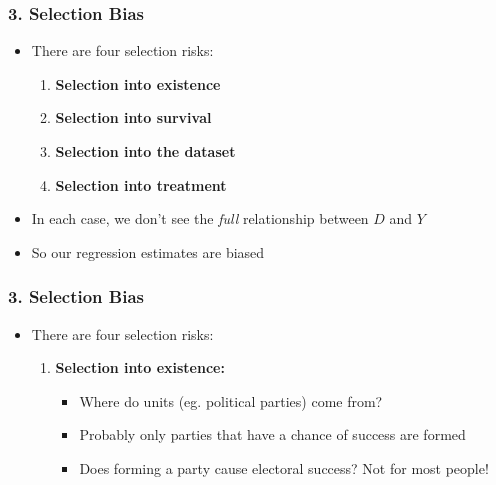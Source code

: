 \documentclass[xcolor=x11names,compress]{beamer}\usepackage[]{graphicx}\usepackage[]{color}
\renewcommand{\(}{\begin{columns}}
\renewcommand{\)}{\end{columns}}
\newcommand{\<}[1]{\begin{column}{#1}}
\renewcommand{\>}{\end{column}}
\begin{document}
\begin{frame}
\frametitle{3. Selection Bias}
\begin{itemize}
\item There are four selection risks:
\begin{enumerate}
\item \textbf{Selection into existence}
\item \textbf{Selection into survival}
\item \textbf{Selection into the dataset}
\item \textbf{Selection into treatment}
\end{enumerate}
\item In each case, we don't see the \textit{full} relationship between $D$ and $Y$
\item So our regression estimates are biased
\end{itemize}
\end{frame}

\begin{frame}
\frametitle{3. Selection Bias}
\begin{itemize}
\item There are four selection risks:
\begin{enumerate}
\item \textbf{Selection into existence:}
\begin{itemize}
\item Where do units (eg. political parties) come from?
\item Probably only parties that have a chance of success are formed
\item Does forming a party cause electoral success? Not for most people!
\end{itemize}
\end{enumerate}
\end{itemize}
\end{frame}
\end{document}
